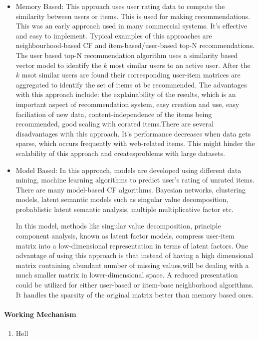 \begin{itemize}
	\item Memory Based:
		This approach uses user rating data to compute the similarity between users or items. This is used for making recommendations. This was an early approach used in many commercial systems. It's effective and easy to implement. Typical examples of this approaches are neighbourhood-based CF and item-based/user-based top-N recommendations. Ths user based top-N recommendation algorithm uses a similarity based vector model to identify the $k$ most similar users to an active user. After the $k$ msot similar users are found their corresponding user-item matrices are aggregated to identify the set of items ot be recommended.
The advantages with this approach include: the explainability of the results, which is an important aspect of recommendation system, easy creation and use, easy faciliation of new data, content-independence of the items being recommended, good scaling with corated items.There are several disadvantages with this approach. It's performance decreases when data gets sparse, which occurs frequently with web-related items. This might hinder the scalability of this approach and createsproblems with large datasets.

\item Model Based:
	In this approach, models are developed using different data mining, machine learning algorithms to predict user's rating of unrated items. There are many model-based CF algorithms. Bayesian networks, clustering models, latent semantic models such as singular value decomposition, probablistic latent semantic analysis, multiple multiplicative factor etc.

In this model, methods like singular value decomposition, principle component analysis, known as latent factor models, compress user-item matrix into a low-dimensional representation in terms of latent factors. One advantage of using this approach is that instead of having a high dimensional matrix containing abundant number of missing values,will be dealing with a much smaller matrix in lower-dimensional space. A reduced presentation could be utilized for either user-based or iitem-base neighborhood algorithms. It handles the sparsity of the original matrix better than memory based ones.
\end{itemize}
\paragraph{Working Mechanism}\hfill
\begin{enumerate}
	\item Hell
\end{enumerate}
